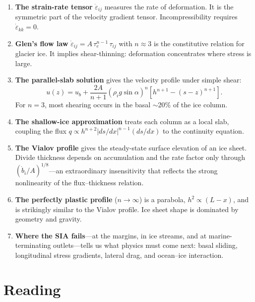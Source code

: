 \documentclass[11pt]{article}
\begin{document}
\begin{enumerate}
  \item \textbf{The strain-rate tensor} $\dot{\varepsilon}_{ij}$ measures the rate of deformation.  It is the symmetric part of the velocity gradient tensor.  Incompressibility requires $\dot{\varepsilon}_{kk} = 0$.

  \item \textbf{Glen's flow law} $\dot{\varepsilon}_{ij} = A\,\tau_e^{n-1}\,\tau_{ij}$ with $n \approx 3$ is the constitutive relation for glacier ice.  It implies shear-thinning: deformation concentrates where stress is large.

  \item \textbf{The parallel-slab solution} gives the velocity profile under simple shear:
  \begin{equation}
    u(z) = u_b + \frac{2A}{n+1}(\rho_i g \sin\alpha)^n \left[h^{n+1} - (s-z)^{n+1}\right].
  \end{equation}
  For $n = 3$, most shearing occurs in the basal $\sim$20\% of the ice column.

  \item \textbf{The shallow-ice approximation} treats each column as a local slab, coupling the flux $q \propto h^{n+2}|ds/dx|^{n-1}(ds/dx)$ to the continuity equation.

  \item \textbf{The Vialov profile} gives the steady-state surface elevation of an ice sheet.  Divide thickness depends on accumulation and the rate factor only through $(\dot{b}_i/A)^{1/8}$---an extraordinary insensitivity that reflects the strong nonlinearity of the flux--thickness relation.

  \item \textbf{The perfectly plastic profile} ($n \to \infty$) is a parabola, $h^2 \propto (L - x)$, and is strikingly similar to the Vialov profile.  Ice sheet shape is dominated by geometry and gravity.

  \item \textbf{Where the SIA fails}---at the margins, in ice streams, and at marine-terminating outlets---tells us what physics must come next: basal sliding, longitudinal stress gradients, lateral drag, and ocean--ice interaction.
\end{enumerate}

\section*{Reading}
\end{document}
